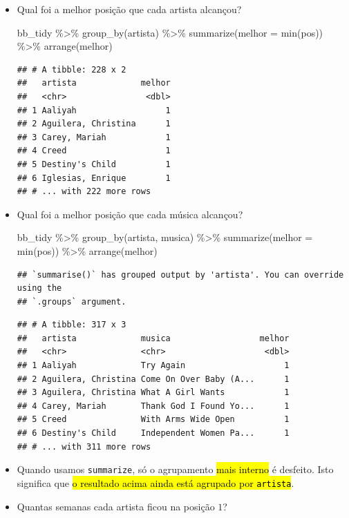 \documentclass[
  11pt]{report}
\newenvironment{Shaded}{\begin{snugshade}}{\end{snugshade}}
\newcommand{\AttributeTok}[1]{\textcolor[rgb]{0.77,0.63,0.00}{#1}}
\newcommand{\FunctionTok}[1]{\textcolor[rgb]{0.00,0.00,0.00}{#1}}
\newcommand{\NormalTok}[1]{#1}
\newcommand{\SpecialCharTok}[1]{\textcolor[rgb]{0.00,0.00,0.00}{#1}}
\renewenvironment{Shaded}{
    \begin{mdframed}[%
      roundcorner=2pt,%
      innerleftmargin=5pt,%
      innerrightmargin=5pt,%
      topline=true,%
      leftline=true,%
      rightline=true,%
      bottomline=true,%
      linewidth=0.5pt,%
      linecolor=black!20,%
      backgroundcolor=black!2,%
      skipabove=2ex,%
      skipbelow=2.5ex%
    ]%
  }
  {
    \end{mdframed}
  }
\begin{document}
\begin{itemize}
\item
  Qual foi a melhor posição que cada artista alcançou?

\begin{Shaded}
\begin{Highlighting}[]
\NormalTok{bb\_tidy }\SpecialCharTok{\%\textgreater{}\%} 
  \FunctionTok{group\_by}\NormalTok{(artista) }\SpecialCharTok{\%\textgreater{}\%} 
  \FunctionTok{summarize}\NormalTok{(}\AttributeTok{melhor =} \FunctionTok{min}\NormalTok{(pos)) }\SpecialCharTok{\%\textgreater{}\%} 
  \FunctionTok{arrange}\NormalTok{(melhor)}
\end{Highlighting}
\end{Shaded}

\begin{verbatim}
## # A tibble: 228 x 2
##   artista             melhor
##   <chr>                <dbl>
## 1 Aaliyah                  1
## 2 Aguilera, Christina      1
## 3 Carey, Mariah            1
## 4 Creed                    1
## 5 Destiny's Child          1
## 6 Iglesias, Enrique        1
## # ... with 222 more rows
\end{verbatim}
\item
  Qual foi a melhor posição que cada música alcançou?

\begin{Shaded}
\begin{Highlighting}[]
\NormalTok{bb\_tidy }\SpecialCharTok{\%\textgreater{}\%} 
  \FunctionTok{group\_by}\NormalTok{(artista, musica) }\SpecialCharTok{\%\textgreater{}\%} 
  \FunctionTok{summarize}\NormalTok{(}\AttributeTok{melhor =} \FunctionTok{min}\NormalTok{(pos)) }\SpecialCharTok{\%\textgreater{}\%} 
  \FunctionTok{arrange}\NormalTok{(melhor)}
\end{Highlighting}
\end{Shaded}

\begin{verbatim}
## `summarise()` has grouped output by 'artista'. You can override using the
## `.groups` argument.
\end{verbatim}

\begin{verbatim}
## # A tibble: 317 x 3
##   artista             musica                  melhor
##   <chr>               <chr>                    <dbl>
## 1 Aaliyah             Try Again                    1
## 2 Aguilera, Christina Come On Over Baby (A...      1
## 3 Aguilera, Christina What A Girl Wants            1
## 4 Carey, Mariah       Thank God I Found Yo...      1
## 5 Creed               With Arms Wide Open          1
## 6 Destiny's Child     Independent Women Pa...      1
## # ... with 311 more rows
\end{verbatim}
\item
  Quando usamos \texttt{summarize}, só o agrupamento {\hl{mais interno}} é desfeito. Isto significa que {\hl{o resultado acima ainda está agrupado por {\mbox{\texttt{artista}}}}}.
\item
  Quantas semanas cada artista ficou na posição $1$?


\end{itemize}
\end{document}
